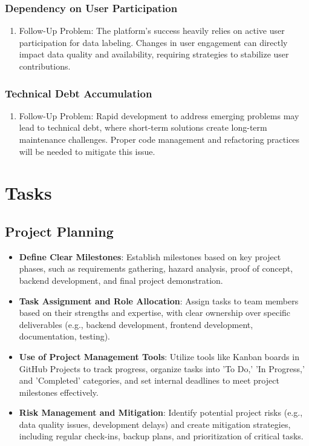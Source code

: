 \documentclass[12pt]{article}
\begin{document}
\subsubsection{Dependency on User Participation}
\begin{enumerate}
    \item Follow-Up Problem: The platform's success heavily relies on active user participation for data labeling. Changes in user engagement can directly impact data quality and availability, requiring strategies to stabilize user contributions.
\end{enumerate}
\subsubsection{Technical Debt Accumulation}
\begin{enumerate}
    \item Follow-Up Problem: Rapid development to address emerging problems may lead to technical debt, where short-term solutions create long-term maintenance challenges. Proper code management and refactoring practices will be needed to mitigate this issue.
\end{enumerate}



\section{Tasks}

\subsection{Project Planning}
\begin{itemize} 
    \item \textbf{Define Clear Milestones}: Establish milestones based on key project phases, such as requirements gathering, hazard analysis, proof of concept, backend development, and final project demonstration.
    \item \textbf{Task Assignment and Role Allocation}: Assign tasks to team members based on their strengths and expertise, with clear ownership over specific deliverables (e.g., backend development, frontend development, documentation, testing).
    \item \textbf{Use of Project Management Tools}: Utilize tools like Kanban boards in GitHub Projects to track progress, organize tasks into 'To Do,' 'In Progress,' and 'Completed' categories, and set internal deadlines to meet project milestones effectively.
    \item \textbf{Risk Management and Mitigation}: Identify potential project risks (e.g., data quality issues, development delays) and create mitigation strategies, including regular check-ins, backup plans, and prioritization of critical tasks.
\end{itemize}
\end{document}
